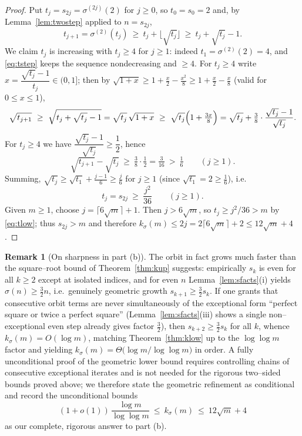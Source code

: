 \documentclass{amsart}
\theoremstyle{definition}
\newtheorem{remark}{Remark}
\begin{document}
\begin{proof}
Put $t_j=s_{2j}=\sigma^{(2j)}(2)$ for $j\ge0$, so $t_0=s_0=2$ and, by
Lemma~\ref{lem:twostep} applied to $n=s_{2j}$,
\begin{equation}\label{eq:tstep}
t_{j+1}=\sigma^{(2)}(t_j)\ \ge\ t_j+\lfloor\sqrt{t_j}\rfloor\ \ge\ t_j+\sqrt{t_j}-1 .
\end{equation}
We claim $t_j$ is increasing with $t_j\ge4$ for $j\ge1$: indeed
$t_1=\sigma^{(2)}(2)=4$, and \eqref{eq:tstep} keeps the sequence
nondecreasing and $\ge4$. For $t_j\ge4$ write $x=\dfrac{\sqrt{t_j}-1}{t_j}\in(0,1]$;
then by $\sqrt{1+x}\ge 1+\tfrac{x}{2}-\tfrac{x^2}{8}\ge 1+\tfrac x2-\tfrac x8$
(valid for $0\le x\le1$),
\[
\sqrt{t_{j+1}}\ \ge\ \sqrt{t_j+\sqrt{t_j}-1}
=\sqrt{t_j}\,\sqrt{1+x}
\ \ge\ \sqrt{t_j}\Bigl(1+\tfrac{3x}{8}\Bigr)
=\sqrt{t_j}+\tfrac38\cdot\frac{\sqrt{t_j}-1}{\sqrt{t_j}} .
\]
For $t_j\ge4$ we have $\dfrac{\sqrt{t_j}-1}{\sqrt{t_j}}\ge\dfrac12$, hence
\[
\sqrt{t_{j+1}}-\sqrt{t_j}\ \ge\ \tfrac38\cdot\tfrac12=\tfrac{3}{16}\ >\ \tfrac16
\qquad(j\ge1).
\]
Summing, $\sqrt{t_j}\ge\sqrt{t_1}+\tfrac{j-1}{6}\ge\tfrac{j}{6}$ for $j\ge1$
(since $\sqrt{t_1}=2\ge\tfrac16$), i.e.
\begin{equation}\label{eq:tlow}
t_j=s_{2j}\ \ge\ \frac{j^2}{36}\qquad(j\ge1).
\end{equation}
Given $m\ge1$, choose $j=\lceil 6\sqrt{m}\rceil+1$. Then $j>6\sqrt m$, so
$t_j\ge j^2/36>m$ by \eqref{eq:tlow}; thus $s_{2j}>m$ and therefore
$k_\sigma(m)\le 2j=2\lceil6\sqrt m\rceil+2\le 12\sqrt m+4$.
\end{proof}

\begin{remark}[On sharpness in part (b)]
The orbit in fact grows much faster than the square--root bound of
Theorem~\ref{thm:kup} suggests: empirically $s_k$ is even for all $k\ge2$
except at isolated indices, and for even $n$ Lemma~\ref{lem:sfacts}(i) yields
$\sigma(n)\ge\tfrac32 n$, i.e.\ genuinely geometric growth $s_{k+1}\ge
\tfrac32 s_k$. If one grants that consecutive orbit terms are never
simultaneously of the exceptional form ``perfect square or twice a perfect
square'' (Lemma~\ref{lem:sfacts}(iii) shows a single non--exceptional even step
already gives factor $\tfrac32$), then $s_{k+2}\ge\tfrac32 s_k$ for all $k$,
whence $k_\sigma(m)=O(\log m)$, matching Theorem~\ref{thm:klow} up to the
$\log\log m$ factor and yielding $k_\sigma(m)=\Theta\!\bigl(\log m/\log\log
m\bigr)$ in order. A fully unconditional proof of the geometric lower bound
requires controlling chains of consecutive exceptional iterates and is not
needed for the rigorous two--sided bounds proved above; we therefore state the
geometric refinement as conditional and record the unconditional bounds
\[
(1+o(1))\,\frac{\log m}{\log\log m}\ \le\ k_\sigma(m)\ \le\ 12\sqrt m+4
\]
as our complete, rigorous answer to part (b).
\end{remark}
\end{document}

